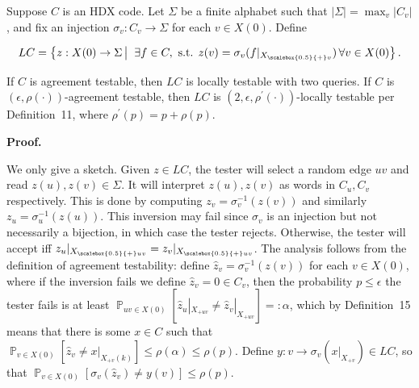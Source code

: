 \documentclass[10pt,a4paper]{article}
\begin{document}
Suppose $C$ is an HDX code. Let $\Sigma$ be a finite alphabet such that $\lvert\Sigma\rvert=\max_{v}\lvert C_{v}\rvert$, and fix an injection $\sigma_{v}:C_{v}\to\Sigma$ for each $v\in X(0)$. Define\par


\[\begin{gathered}
LC=\left\{z:X(0)\to\Sigma\left|\;\vphantom{z:X(0)\to\Sigma\exists f\in C,\hbox{ s.t. }z(v)=\sigma_{v}(f|_{{X}_{\scalebox{0.5}{+}v}})\,\forall v\in X(0)}\right.\exists f\in C,\hbox{ s.t. }z(v)=\sigma_{v}(f|_{{X}_{\scalebox{0.5}{+}v}})\,\forall v\in X(0)\right\}.
\end{gathered}\]


If $C$ is agreement testable, then $LC$ is locally testable with two queries. If $C$ is $(\epsilon,\rho(\cdot))$-agreement testable, then $LC$ is $(2,\epsilon,\rho^{\prime}(\cdot))$-locally testable per Definition 11, where $\rho^{\prime}(p)=p+\rho(p)$.\par







\par\medskip\noindent\textbf{
\textbf{Proof}.}\par




We only give a sketch. Given $z\in LC$, the tester will select a random edge $uv$ and read $z(u),z(v)\in\Sigma$. It will interpret $z(u),z(v)$ as words in $C_{u},C_{v}$ respectively. This is done by computing $z_{v}=\sigma_{v}^{-1}(z(v))$ and similarly $z_{u}=\sigma_{u}^{-1}(z(u))$. This inversion may fail since $\sigma_{v}$ is an injection but not necessarily a bijection, in which case the tester rejects. Otherwise, the tester will accept iff $z_{u}|_{{X}_{\scalebox{0.5}{+}uv}}=z_{v}|_{{X}_{\scalebox{0.5}{+}uv}}$. The analysis follows from the definition of agreement testability: define $\hat{z}_{v}=\sigma^{-1}_{v}(z(v))$ for each $v\in X(0)$, where if the inversion fails we define $\hat{z}_{v}=0\in C_{v}$, then the probability $p\leq\epsilon$ the tester fails is at least $\operatorname*{\mathbb{P}}_{uv\in X(0)}\left[\hat{z}_{u}|_{X_{+uv}}\not=\hat{z}_{v}|_{X_{+uv}}\right]=:\alpha$, which by Definition 15 means that there is some $x\in C$ such that $\operatorname*{\mathbb{P}}_{v\in X(0)}\left[\hat{z}_{v}\not=x|_{X_{+v}(k)}\right]\leq\rho(\alpha)\leq\rho(p)$. Define $y:v\rightarrow\sigma_{v}(x|_{X_{+v}})\in LC$, so that $\operatorname*{\mathbb{P}}_{v\in X(0)}\left[\sigma_{v}(\hat{z}_{v})\not=y(v)\right]\leq\rho(p)$.\par
\end{document}
